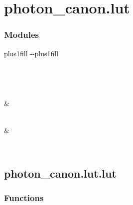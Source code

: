 \documentclass[letterpaper,10pt,english]{sphinxmanual}
\begin{document}
\section{photon\_canon.lut}
\label{\detokenize{generated/photon_canon.lut:module-photon_canon.lut}}\label{\detokenize{generated/photon_canon.lut:photon-canon-lut}}\label{\detokenize{generated/photon_canon.lut::doc}}\subsubsection*{Modules}


\begin{savenotes}
\sphinxatlongtablestart
\sphinxthistablewithglobalstyle
\sphinxthistablewithnovlinesstyle
\makeatletter
  \LTleft \@totalleftmargin plus1fill
  \LTright\dimexpr\columnwidth-\@totalleftmargin-\linewidth\relax plus1fill
\makeatother
\begin{longtable}{}
\sphinxtoprule
\endfirsthead

\\
\sphinxtoprule
\endhead

\sphinxbottomrule
{}\\
\endfoot

\endlastfoot
\sphinxtableatstartofbodyhook

\sphinxAtStartPar
{\hyperref[\detokenize{generated/photon_canon.lut.lut:module-photon_canon.lut.lut}]{}}
&
\sphinxAtStartPar

\\
\sphinxhline
\sphinxAtStartPar
{\hyperref[\detokenize{generated/photon_canon.lut.utils:module-photon_canon.lut.utils}]{}}
&
\sphinxAtStartPar

\\
\sphinxbottomrule
\end{longtable}
\sphinxtableafterendhook
\sphinxatlongtableend
\end{savenotes}

\sphinxstepscope


\subsection{photon\_canon.lut.lut}
\label{\detokenize{generated/photon_canon.lut.lut:module-photon_canon.lut.lut}}\label{\detokenize{generated/photon_canon.lut.lut:photon-canon-lut-lut}}\label{\detokenize{generated/photon_canon.lut.lut::doc}}\subsubsection*{Functions}
\end{document}
